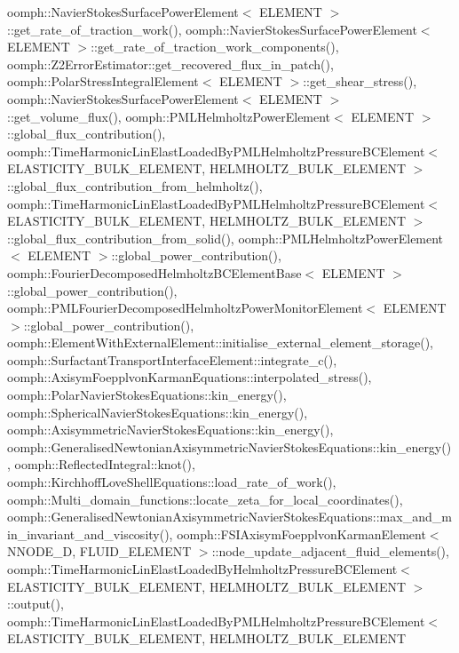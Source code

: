 oomph\+::\+Navier\+Stokes\+Surface\+Power\+Element$<$ E\+L\+E\+M\+E\+N\+T $>$\+::get\+\_\+rate\+\_\+of\+\_\+traction\+\_\+work(), oomph\+::\+Navier\+Stokes\+Surface\+Power\+Element$<$ E\+L\+E\+M\+E\+N\+T $>$\+::get\+\_\+rate\+\_\+of\+\_\+traction\+\_\+work\+\_\+components(), oomph\+::\+Z2\+Error\+Estimator\+::get\+\_\+recovered\+\_\+flux\+\_\+in\+\_\+patch(), oomph\+::\+Polar\+Stress\+Integral\+Element$<$ E\+L\+E\+M\+E\+N\+T $>$\+::get\+\_\+shear\+\_\+stress(), oomph\+::\+Navier\+Stokes\+Surface\+Power\+Element$<$ E\+L\+E\+M\+E\+N\+T $>$\+::get\+\_\+volume\+\_\+flux(), oomph\+::\+P\+M\+L\+Helmholtz\+Power\+Element$<$ E\+L\+E\+M\+E\+N\+T $>$\+::global\+\_\+flux\+\_\+contribution(), oomph\+::\+Time\+Harmonic\+Lin\+Elast\+Loaded\+By\+P\+M\+L\+Helmholtz\+Pressure\+B\+C\+Element$<$ E\+L\+A\+S\+T\+I\+C\+I\+T\+Y\+\_\+\+B\+U\+L\+K\+\_\+\+E\+L\+E\+M\+E\+N\+T, H\+E\+L\+M\+H\+O\+L\+T\+Z\+\_\+\+B\+U\+L\+K\+\_\+\+E\+L\+E\+M\+E\+N\+T $>$\+::global\+\_\+flux\+\_\+contribution\+\_\+from\+\_\+helmholtz(), oomph\+::\+Time\+Harmonic\+Lin\+Elast\+Loaded\+By\+P\+M\+L\+Helmholtz\+Pressure\+B\+C\+Element$<$ E\+L\+A\+S\+T\+I\+C\+I\+T\+Y\+\_\+\+B\+U\+L\+K\+\_\+\+E\+L\+E\+M\+E\+N\+T, H\+E\+L\+M\+H\+O\+L\+T\+Z\+\_\+\+B\+U\+L\+K\+\_\+\+E\+L\+E\+M\+E\+N\+T $>$\+::global\+\_\+flux\+\_\+contribution\+\_\+from\+\_\+solid(), oomph\+::\+P\+M\+L\+Helmholtz\+Power\+Element$<$ E\+L\+E\+M\+E\+N\+T $>$\+::global\+\_\+power\+\_\+contribution(), oomph\+::\+Fourier\+Decomposed\+Helmholtz\+B\+C\+Element\+Base$<$ E\+L\+E\+M\+E\+N\+T $>$\+::global\+\_\+power\+\_\+contribution(), oomph\+::\+P\+M\+L\+Fourier\+Decomposed\+Helmholtz\+Power\+Monitor\+Element$<$ E\+L\+E\+M\+E\+N\+T $>$\+::global\+\_\+power\+\_\+contribution(), oomph\+::\+Element\+With\+External\+Element\+::initialise\+\_\+external\+\_\+element\+\_\+storage(), oomph\+::\+Surfactant\+Transport\+Interface\+Element\+::integrate\+\_\+c(), oomph\+::\+Axisym\+Foepplvon\+Karman\+Equations\+::interpolated\+\_\+stress(), oomph\+::\+Polar\+Navier\+Stokes\+Equations\+::kin\+\_\+energy(), oomph\+::\+Spherical\+Navier\+Stokes\+Equations\+::kin\+\_\+energy(), oomph\+::\+Axisymmetric\+Navier\+Stokes\+Equations\+::kin\+\_\+energy(), oomph\+::\+Generalised\+Newtonian\+Axisymmetric\+Navier\+Stokes\+Equations\+::kin\+\_\+energy(), oomph\+::\+Reflected\+Integral\+::knot(), oomph\+::\+Kirchhoff\+Love\+Shell\+Equations\+::load\+\_\+rate\+\_\+of\+\_\+work(), oomph\+::\+Multi\+\_\+domain\+\_\+functions\+::locate\+\_\+zeta\+\_\+for\+\_\+local\+\_\+coordinates(), oomph\+::\+Generalised\+Newtonian\+Axisymmetric\+Navier\+Stokes\+Equations\+::max\+\_\+and\+\_\+min\+\_\+invariant\+\_\+and\+\_\+viscosity(), oomph\+::\+F\+S\+I\+Axisym\+Foepplvon\+Karman\+Element$<$ N\+N\+O\+D\+E\+\_\+D, F\+L\+U\+I\+D\+\_\+\+E\+L\+E\+M\+E\+N\+T $>$\+::node\+\_\+update\+\_\+adjacent\+\_\+fluid\+\_\+elements(), oomph\+::\+Time\+Harmonic\+Lin\+Elast\+Loaded\+By\+Helmholtz\+Pressure\+B\+C\+Element$<$ E\+L\+A\+S\+T\+I\+C\+I\+T\+Y\+\_\+\+B\+U\+L\+K\+\_\+\+E\+L\+E\+M\+E\+N\+T, H\+E\+L\+M\+H\+O\+L\+T\+Z\+\_\+\+B\+U\+L\+K\+\_\+\+E\+L\+E\+M\+E\+N\+T $>$\+::output(), oomph\+::\+Time\+Harmonic\+Lin\+Elast\+Loaded\+By\+P\+M\+L\+Helmholtz\+Pressure\+B\+C\+Element$<$ E\+L\+A\+S\+T\+I\+C\+I\+T\+Y\+\_\+\+B\+U\+L\+K\+\_\+\+E\+L\+E\+M\+E\+N\+T, H\+E\+L\+M\+H\+O\+L\+T\+Z\+\_\+\+B\+U\+L\+K\+\_\+\+E\+L\+E\+M\+E\+N\+T 
